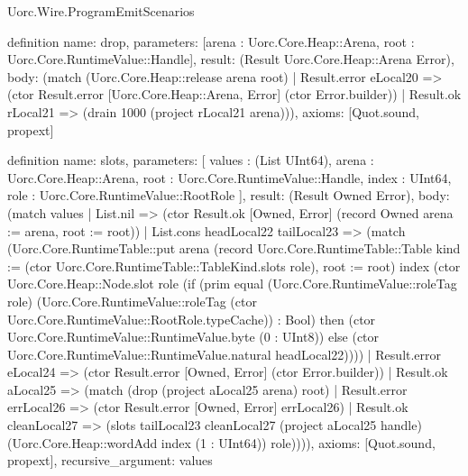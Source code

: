 \begin{lexlean}{Uorc.Wire.ProgramEmitScenarios}
\begin{semanticmodule}
definition{
  name: drop,
  parameters: [arena : Uorc.Core.Heap::Arena, root : Uorc.Core.RuntimeValue::Handle],
  result: (Result Uorc.Core.Heap::Arena Error),
  body: (match (Uorc.Core.Heap::release arena root)
    | Result.error eLocal20 => (ctor Result.error [Uorc.Core.Heap::Arena, Error] (ctor Error.builder))
    | Result.ok rLocal21 => (drain 1000 (project rLocal21 arena))),
  axioms: [Quot.sound, propext]
}

definition{
  name: slots,
  parameters: [
    values : (List UInt64),
    arena : Uorc.Core.Heap::Arena,
    root : Uorc.Core.RuntimeValue::Handle,
    index : UInt64,
    role : Uorc.Core.RuntimeValue::RootRole
  ],
  result: (Result Owned Error),
  body: (match values
    | List.nil => (ctor Result.ok [Owned, Error] (record Owned {arena := arena, root := root}))
    | List.cons headLocal22 tailLocal23 => (match (Uorc.Core.RuntimeTable::put arena (record Uorc.Core.RuntimeTable::Table {kind := (ctor Uorc.Core.RuntimeTable::TableKind.slots role), root := root}) index (ctor Uorc.Core.Heap::Node.slot role (if (prim equal (Uorc.Core.RuntimeValue::roleTag role) (Uorc.Core.RuntimeValue::roleTag (ctor Uorc.Core.RuntimeValue::RootRole.typeCache)) : Bool) then (ctor Uorc.Core.RuntimeValue::RuntimeValue.byte (0 : UInt8)) else (ctor Uorc.Core.RuntimeValue::RuntimeValue.natural headLocal22))))
      | Result.error eLocal24 => (ctor Result.error [Owned, Error] (ctor Error.builder))
      | Result.ok aLocal25 => (match (drop (project aLocal25 arena) root)
        | Result.error errLocal26 => (ctor Result.error [Owned, Error] errLocal26)
        | Result.ok cleanLocal27 => (slots tailLocal23 cleanLocal27 (project aLocal25 handle) (Uorc.Core.Heap::wordAdd index (1 : UInt64)) role)))),
  axioms: [Quot.sound, propext],
  recursive_argument: values
}


\end{semanticmodule}
\end{lexlean}
